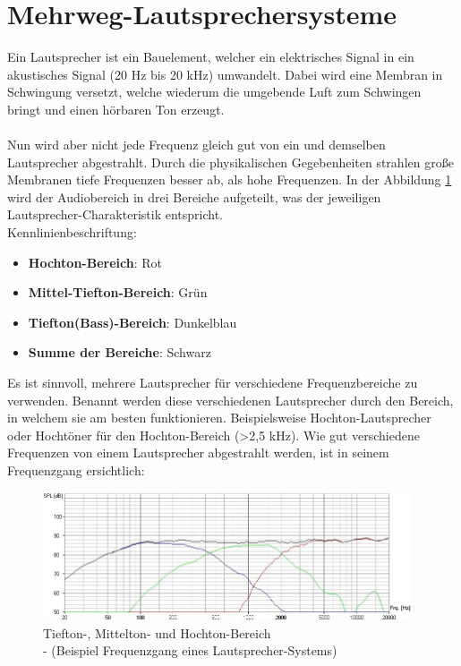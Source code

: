 \section{Mehrweg-Lautsprechersysteme}\label{sec:3.2}
Ein Lautsprecher ist ein Bauelement, welcher ein elektrisches Signal in ein akustisches Signal (20 Hz bis 20 kHz) umwandelt.
Dabei wird eine Membran in Schwingung versetzt, welche wiederum die umgebende Luft zum Schwingen bringt und einen hörbaren Ton erzeugt.
\\ \\
Nun wird aber nicht jede Frequenz gleich gut von ein und demselben Lautsprecher abgestrahlt.
Durch die physikalischen Gegebenheiten strahlen große Membranen tiefe Frequenzen besser ab, als hohe Frequenzen.
In der Abbildung \ref{fig:3.2.1} wird der Audiobereich in drei Bereiche aufgeteilt, was der jeweiligen Lautsprecher-Charakteristik entspricht.\\
Kennlinienbeschriftung:\\
\begin{itemize}
	\item \textbf{Hochton-Bereich}: Rot
	\item \textbf{Mittel-Tiefton-Bereich}: Grün
	\item \textbf{Tiefton(Bass)-Bereich}: Dunkelblau
	\item \textbf{Summe der Bereiche}: Schwarz	
\end{itemize}
Es ist sinnvoll, mehrere Lautsprecher für verschiedene Frequenzbereiche zu verwenden.
Benannt werden diese verschiedenen Lautsprecher durch den Bereich, in welchem sie am besten funktionieren.
Beispielsweise Hochton-Lautsprecher oder Hochtöner für den Hochton-Bereich (>2,5 kHz).
Wie gut verschiedene Frequenzen von einem Lautsprecher abgestrahlt werden, ist in seinem Frequenzgang ersichtlich:
\begin{figure} [H]
	\centering
	\includegraphics[width=0.97\textwidth]{img/Grundlagen/Mehrweg-Lautsprechersysteme/Frequenzbereiche-Audio-cut.jpg}
	\caption[Tiefton-, Mittelton- und Hochton-Bereich\\- (Beispiel Frequenzgang eines Lautsprecher-Systems)]{Tiefton-, Mittelton- und Hochton-Bereich\\- (Beispiel Frequenzgang eines Lautsprecher-Systems)\footnotemark}
	\label{fig:3.2.1}
\end{figure}

